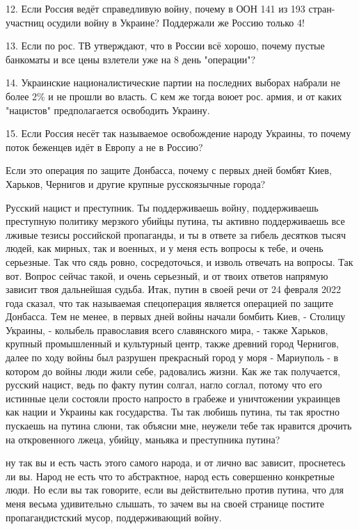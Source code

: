 12. Если Россия ведёт справедливую войну, почему в ООН 141 из 193
стран-участниц осудили войну в Украине? Поддержали же Россию только 4!

13. Если по рос. ТВ утверждают, что в России всё хорошо, почему пустые
банкоматы и все цены взлетели уже на 8 день "операции"?

14. Украинские националистические партии на последних выборах набрали не более
2\% и не прошли во власть. С кем же тогда воюет рос. армия, и от каких
"нацистов" предполагается освободить Украину.

15. Если Россия несёт так называемое освобождение народу Украины, то почему
поток беженцев идёт в Европу а не в Россию?


Если это операция по защите Донбасса, почему с первых дней бомбят Киев,
Харьков, Чернигов и другие крупные русскоязычные города?

Русский нацист и преступник. Ты поддерживаешь войну, поддерживаешь преступную
политику мерзкого убийцы путина, ты активно поддерживаешь все лживые тезисы
российской пропаганды, и ты в ответе за гибель десятков тысяч людей, как
мирных, так и военных, и у меня есть вопросы к тебе, и очень серьезные. Так что
сядь ровно, сосредоточься, и изволь отвечать на вопросы.  Так вот. Вопрос
сейчас такой, и очень серьезный, и от твоих ответов напрямую зависит твоя
дальнейшая судьба. Итак, путин в своей речи от 24 февраля 2022 года сказал, что
так называемая спецоперация является операцией по защите Донбасса. Тем не
менее, в первых дней войны начали бомбить Киев, - Столицу Украины, - колыбель
православия всего славянского мира, - также Харьков, крупный промышленный и
культурный центр, также древний город Чернигов, далее по ходу войны был
разрушен прекрасный город у моря - Мариуполь - в котором до войны люди жили
себе, радовались жизни. Как же так получается, русский нацист, ведь по факту
путин солгал, нагло соглал, потому что его истинные цели состояли просто
напросто в грабеже и уничтожении украинцев как нации и Украины как государства.
Ты так любишь путина, ты так яростно пускаешь на путина слюни, так объясни мне,
неужели тебе так нравится дрочить на откровенного лжеца, убийцу, маньяка и
преступника путина?

ну так вы и есть часть этого самого народа, и от лично вас зависит, проснетесь
ли вы. Народ не есть что то абстрактное, народ есть совершенно конкретные люди.
Но если вы так говорите, если вы действительно против путина, что для меня
весьма удивительно слышать, то зачем вы на своей странице постите
пропагандистский мусор, поддерживающий войну. 
